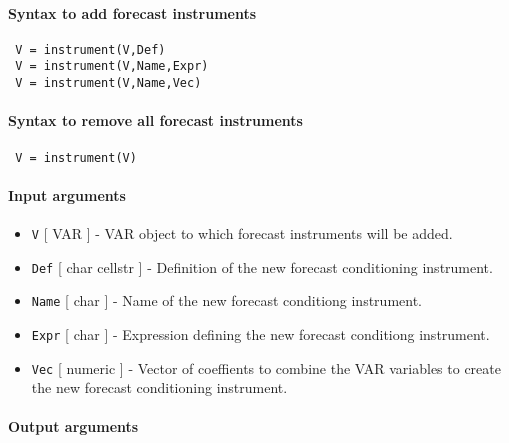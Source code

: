 


	\paragraph{Syntax to add forecast instruments}
 
 \begin{verbatim}
 V = instrument(V,Def)
 V = instrument(V,Name,Expr)
 V = instrument(V,Name,Vec)
 \end{verbatim}
 
 \paragraph{Syntax to remove all forecast instruments}
 
 \begin{verbatim}
 V = instrument(V)
 \end{verbatim}
 
 \paragraph{Input arguments}
 
 \begin{itemize}
 \item
   \texttt{V} {[} VAR {]} - VAR object to which forecast instruments will
   be added.
 \item
   \texttt{Def} {[} char \textbar{} cellstr {]} - Definition of the new
   forecast conditioning instrument.
 \item
   \texttt{Name} {[} char {]} - Name of the new forecast conditiong
   instrument.
 \item
   \texttt{Expr} {[} char {]} - Expression defining the new forecast
   conditiong instrument.
 \item
   \texttt{Vec} {[} numeric {]} - Vector of coeffients to combine the VAR
   variables to create the new forecast conditioning instrument.
 \end{itemize}
 
 \paragraph{Output arguments}


